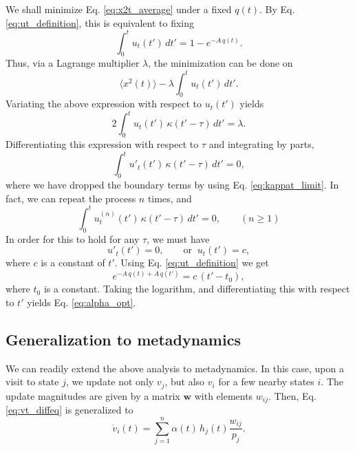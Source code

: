\documentclass[reprint]{revtex4-1}
\begin{document}
We shall minimize Eq. \eqref{eq:x2t_average} under a fixed $q(t)$.
%
By Eq. \eqref{eq:ut_definition},
this is equivalent to fixing
%
$$
\int_0^t u_t(t') \, dt'
=
1 - e^{-A \, q(t)}.
$$
%
Thus, via a Lagrange multiplier $\lambda$,
the minimization can be done on
%
$$
\langle x^2(t) \rangle - \lambda \int_0^t u_t(t') \, dt'.
$$
%
Variating the above expression with respect to $u_t(t')$ yields
$$
2 \int_0^t u_t(t') \, \kappa(t' - \tau) \, dt'
= \lambda.
$$
Differentiating this expression with respect to $\tau$
and integrating by parts,
$$
\int_0^t u'_t(t') \, \kappa(t' - \tau) \, dt' = 0,
$$
where we have dropped the boundary terms
by using Eq. \eqref{eq:kappat_limit}.
%
In fact, we can repeat the process $n$ times, and
$$
\int_0^t u_t^{(n)}(t') \, \kappa(t' - \tau) \, dt' = 0,
\qquad (n \ge 1)
$$
%
In order for this to hold for any $\tau$,
we must have
$$
u'_t(t') = 0,
\qquad
\mathrm{or}
\;\;
u_t(t') = c,
$$
where $c$ is a constant of $t'$.
%
Using Eq. \eqref{eq:ut_definition}
we get
$$
e^{-A \, q(t) + A \, q(t')}
=
c \, (t' - t_0),
$$
where $t_0$ is a constant.
%
Taking the logarithm, and differentiating this with respect to $t'$
yields Eq. \eqref{eq:alpha_opt}.



\subsection{Generalization to metadynamics}



We can readily extend the above analysis to metadynamics.
In this case,
upon a visit to state $j$,
we update not only $v_j$,
but also $v_i$ for a few nearby states $i$.
%
The update magnitudes are given by a matrix $\mathbf w$
with elements $w_{ij}$.
%
Then, Eq. \eqref{eq:vt_diffeq} is generalized to
\begin{equation}
  \dot v_i(t) =
  \sum_{j=1}^n \alpha(t) \, h_j(t) \frac{ w_{ij} } { p_j }.
  \label{eq:vt_diffeq_metadynamics}
\end{equation}
\end{document}

